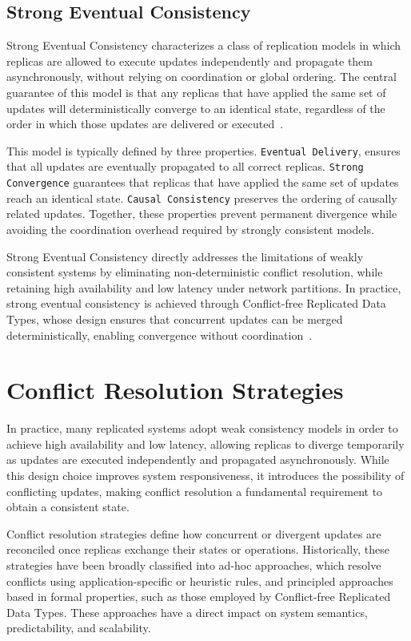 \subsection{Strong Eventual Consistency}
\label{sub:sec}

Strong Eventual Consistency characterizes a class of replication models in which replicas are allowed to execute updates independently and propagate them asynchronously, without relying on coordination or global ordering. The central guarantee of this model is that any replicas that have applied the same set of updates will deterministically converge to an identical state, regardless of the order in which those updates are delivered or executed~\cite{shapiro2011comprehensive}.

This model is typically defined by three properties. \texttt{Eventual Delivery}, ensures that all updates are eventually propagated to all correct replicas. \texttt{Strong Convergence} guarantees that replicas that have applied the same set of updates reach an identical state. \texttt{Causal Consistency} preserves the ordering of causally related updates. Together, these properties prevent permanent divergence while avoiding the coordination overhead required by strongly consistent models.

Strong Eventual Consistency directly addresses the limitations of weakly consistent systems by eliminating non-deterministic conflict resolution, while retaining high availability and low latency under network partitions. In practice, strong eventual consistency is achieved through Conflict-free Replicated Data Types, whose design ensures that concurrent updates can be merged deterministically, enabling convergence without coordination~\cite{preguica2018overview}.

\section{Conflict Resolution Strategies}
\label{sec:conflict}

In practice, many replicated systems adopt weak consistency models in order to achieve high availability and low latency, allowing replicas to diverge temporarily as updates are executed independently and propagated asynchronously. While this design choice improves system responsiveness, it introduces the possibility of conflicting updates, making conflict resolution a fundamental requirement to obtain a consistent state.

Conflict resolution strategies define how concurrent or divergent updates are reconciled once replicas exchange their states or operations. Historically, these strategies have been broadly classified into ad-hoc approaches, which resolve conflicts using application-specific or heuristic rules, and principled approaches based in formal properties, such as those employed by Conflict-free Replicated Data Types. These approaches have a direct impact on system semantics, predictability, and scalability.

